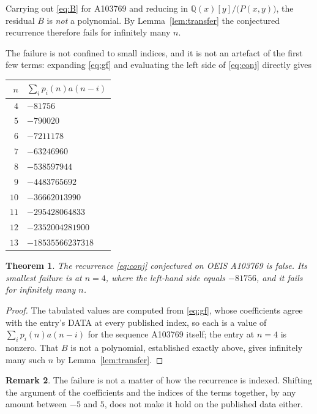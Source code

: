 \documentclass[11pt,a4paper]{article}
\theoremstyle{plain}
\newtheorem{theorem}{Theorem}
\theoremstyle{definition}
\newtheorem{remark}[theorem]{Remark}
\begin{document}
Carrying out \eqref{eq:B} for A103769 and reducing in $\mathbb{Q}(x)[y]/\bigl(P(x,y)\bigr)$, the residual $B$ is
\emph{not} a polynomial. By Lemma~\ref{lem:transfer} the conjectured recurrence therefore
fails for infinitely many $n$.

The failure is not confined to small indices, and it is not an artefact of the first few
terms: expanding \eqref{eq:gf} and evaluating the left side of \eqref{eq:conj} directly
gives

\begin{center}
\begin{tabular}{r@{\qquad}l}
$n$ & $\sum_{i}p_{i}(n)a(n-i)$ \\ \hline
$4$ & $-81756$ \\
$5$ & $-790020$ \\
$6$ & $-7211178$ \\
$7$ & $-63246960$ \\
$8$ & $-538597944$ \\
$9$ & $-4483765692$ \\
$10$ & $-36662013990$ \\
$11$ & $-295428064833$ \\
$12$ & $-2352004281900$ \\
$13$ & $-18535566237318$
\end{tabular}
\end{center}

\begin{theorem}
The recurrence \eqref{eq:conj} conjectured on OEIS A103769 is false. Its smallest failure
is at $n=4$, where the left-hand side equals $-81756$, and it fails for
infinitely many $n$.
\end{theorem}

\begin{proof}
The tabulated values are computed from \eqref{eq:gf}, whose coefficients agree with the
entry's DATA at every published index, so each is a value of $\sum_{i}p_{i}(n)a(n-i)$ for
the sequence A103769 itself; the entry at $n=4$ is nonzero. That $B$ is not a
polynomial, established exactly above, gives infinitely many such $n$ by
Lemma~\ref{lem:transfer}.
\end{proof}

\begin{remark}
The failure is not a matter of how the recurrence is indexed. Shifting the argument of the coefficients and the indices of the terms together, by any amount between $-5$ and $5$, does not make it hold on the published data either.
\end{remark}
\end{document}
